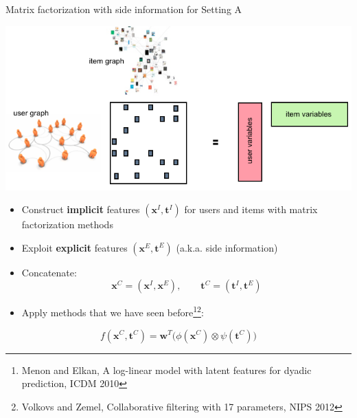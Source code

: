 \documentclass[]{beamer}
\renewcommand{\vec}[1]{\boldsymbol{#1}}
\renewcommand{\alert}[1]{\textbf{\color{putblue} #1}}
\begin{document}
\begin{frame}{Matrix factorization with side information for Setting A}

\begin{center}
\includegraphics[scale=0.3]{pics/settingA}
\end{center}
\begin{itemize}
\item Construct \alert{implicit} features $(\vec{x}^I,\vec{t}^I)$ for users and items with matrix factorization methods
\item Exploit \alert{explicit} features $(\vec{x}^E,\vec{t}^E)$ (a.k.a. side information)
\item Concatenate: 
$$\vec{x}^C = (\vec{x}^I,\vec{x}^E), \qquad \vec{t}^C = (\vec{t}^I,\vec{t}^E)$$
\item Apply methods that we have seen before\footnote{Menon and Elkan, A log-linear model with latent features for dyadic prediction, ICDM 2010}\footnote{Volkovs and Zemel, Collaborative filtering with 17 parameters, NIPS 2012}: 
\end{itemize}
\begin{equation*}
\label{eq:pairwise}
f(\vec{x}^C,\vec{t}^C) = \vec{w}^T \big(\phi(\vec{x}^C) \otimes \psi(\vec{t}^C)\big)    
\end{equation*}
\vspace{-0.2cm}
\end{frame}

%
%
\end{document}
